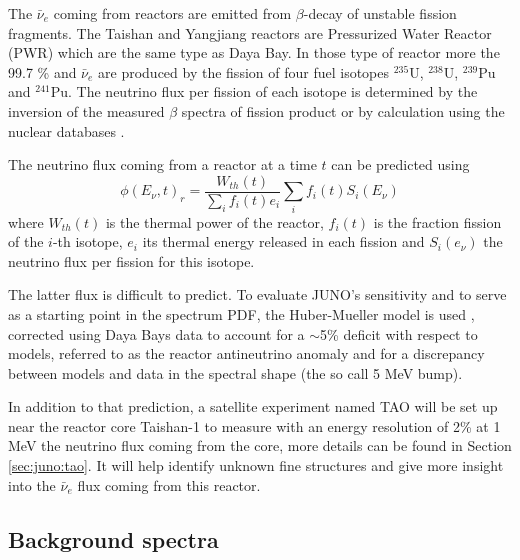 \documentclass[../main.tex]{subfiles}
\begin{document}
The $\bar{\nu}_e$ coming from reactors are emitted from $\beta$-decay of unstable fission fragments. The Taishan and Yangjiang reactors are Pressurized Water Reactor (PWR) which are the same type as Daya Bay. In those type of reactor more the 99.7 \% and $\bar{\nu}_e$ are produced by the fission of four fuel isotopes $^{235}$U, $^{238}$U, $^{239}$Pu and $^{241}$Pu. The neutrino flux per fission of each isotope is determined by the inversion of the measured $\beta$ spectra of fission product \cite{hahn_antineutrino_1989, mueller_improved_2011, von_feilitzsch_experimental_1982, schreckenbach_determination_1985, huber_determination_2011} or by calculation using the nuclear databases \cite{vogel_reactor_1981, dwyer_spectral_2015}.

The neutrino flux coming from a reactor at a time $t$ can be predicted using
\begin{equation}
  \phi(E_\nu, t)_r = \frac{W_{th}(t)}{\sum_i f_i(t) e_i} \sum_i f_i(t) S_i(E_\nu)
\end{equation}
where $W_{th}(t)$ is the thermal power of the reactor, $f_i(t)$ is the fraction fission of the $i$-th isotope, $e_i$ its thermal energy released in each fission and $S_i(e_\nu)$ the neutrino flux per fission for this isotope.

The latter flux is difficult to predict. To evaluate JUNO's sensitivity and to serve as a starting point in the spectrum PDF, the Huber-Mueller model is used \cite{mueller_improved_2011}, corrected
using Daya Bays data \cite{daya_bay_collaboration_measurement_2016} to account for a $\sim$5\% deficit with respect to models, referred to as the reactor antineutrino anomaly \cite{mention_reactor_2011} and for a discrepancy between models and data in the spectral shape (the so call 5 MeV bump).

In addition to that prediction, a satellite experiment named TAO \cite{juno_collaboration_tao_2020} will be set up near the reactor core Taishan-1 to measure with an energy resolution of 2\% at 1 MeV the neutrino flux coming from the core, more details can be found in Section \ref{sec:juno:tao}. It will help identify unknown fine structures and give more insight into the $\bar{\nu}_e$ flux coming from this reactor.

\subsection{Background spectra}
\end{document}
